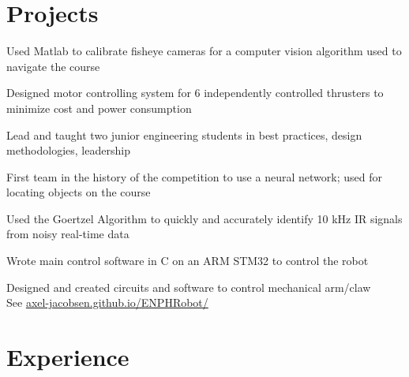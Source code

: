 \documentclass[]{deedy-resume-openfont}
\begin{document}

	\section{Projects}
	\begin{tightemize}
		\item Used Matlab to calibrate fisheye cameras for a computer vision algorithm used to navigate the course
		\item Designed motor controlling system for 6 independently controlled thrusters to minimize cost and power consumption
		\item Lead and taught two junior engineering students in best practices, design methodologies, leadership
	\end{tightemize}
	\vspace{8pt}
	
	\begin{tightemize}
		\item First team in the history of the competition to use a neural network; used for locating objects on the course
		\item Used the Goertzel Algorithm to quickly and accurately identify 10 kHz IR signals from noisy real-time data
		\item Wrote main control software in C on an ARM STM32 to control the robot
		\item Designed and created circuits and software to control mechanical arm/claw \\
		See \href{https://axel-jacobsen.github.io/ENPHRobot/}{axel-jacobsen.github.io/ENPHRobot/}
	\end{tightemize}
	\vspace{10pt}
	
	\section{Experience}
	
\end{document}
